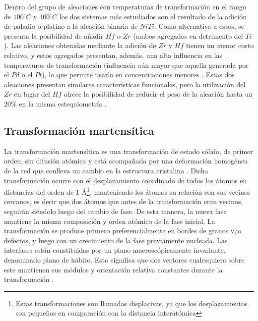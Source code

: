 \documentclass[12pt]{article}
\theoremstyle{definition}
\theoremstyle{remark}
\begin{document}
Dentro del grupo de aleaciones con temperaturas de transformación en el rango de $100^\circ C$ y $400^\circ C$ los dos sistemas más estudiados son el resultado de la adición de paladio o platino a la aleación binaria de $NiTi$. Como alternativa a estos, se presenta la posibilidad de añadir $Hf$ o $Zr$ (ambos agregados en detrimento del $Ti$)\citep{HTSMA}. Las aleaciones obtenidas mediante la adición de $Zr$ y $Hf$ tienen un menor costo relativo, y estos agregados presentan, además, una alta influencia en las temperaturas de transformación (influencia aún mayor que aquella generada por el $Pd$ o el $Pt$), lo que permite usarlo en concentraciones menores \citep{HTSMA}. Estas dos aleaciones presentan similares características funcionales, pero la utilización del $Zr$ en lugar del $Hf$ ofrece la posibilidad de reducir el peso de la aleación hasta un 20\% en la misma estequiometría \citep{Evirgen2013}.

\subsection{Transformación martensítica}

La transformación martensítica es una transformación de estado sólido, de primer orden, sin difusión atómica y está acompañada por una deformación homogénea de la red que conlleva un cambio en la estructura cristalina \citep{Santamarta}. Dicha transformación ocurre con el desplazamiento coordinado de todos los átomos en distancias del orden de 1 \AA \footnote{Estas transformaciones son llamadas displacivas, ya que los desplazamientos son pequeños en comparación con la distancia interatómica}, manteniendo los átomos su relación con sus vecinos cercanos, es decir que dos átomos que antes de la transformación eran vecinos, seguirán siéndolo luego del cambio de fase\citep{HTSMA}. De esta manera, la nueva fase mantiene la misma composición y orden atómico de la fase inicial. La transformación se produce primero preferencialmente en bordes de granos y/o defectos, y luego con un crecimiento de la fase previamente nucleada. Las interfases están constituidas por un plano macroscópicamente invariante, denominado plano de hábito. Esto significa que dos vectores cualesquiera sobre este mantienen sus módulos y orientación relativa constantes durante la transformación \citep{Santamarta}.
\end{document}
